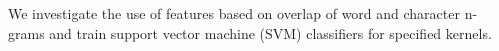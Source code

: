 We investigate the use of features based on overlap of word and character n-grams and train support vector machine (SVM) classifiers for specified kernels.
